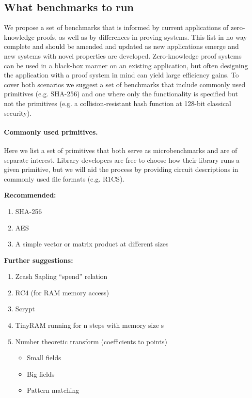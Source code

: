 \subsection{What benchmarks to run}
We propose a set of benchmarks that is informed by current applications of zero-knowledge proofs, as well as by differences in proving systems. This list in no way complete and should be amended and updated as new applications emerge and new systems with novel properties are developed. Zero-knowledge proof systems can be used in a black-box manner on an existing application, but often designing the application with a proof system in mind can yield large efficiency gains. To cover both scenarios we suggest a set of benchmarks that include commonly used primitives (e.g. SHA-256) and one where only the functionality is specified but not the primitives (e.g. a collision-resistant hash function at 128-bit classical security). 


\paragraph{Commonly used primitives.}

Here we list a set of primitives that both serve as microbenchmarks and are of separate interest. Library developers are free to choose how their library runs a given primitive, but we will aid the process by providing circuit descriptions in commonly used file formats (e.g. R1CS). 


\textbf{Recommended:}
\begin{enumerate}
    \item SHA-256
    \item AES
    \item A simple vector or matrix product at different sizes
\end{enumerate}

\textbf{Further suggestions:}
\begin{enumerate}[label={- }]
    \item Zcash Sapling “spend” relation
    \item RC4 (for RAM memory access)
    \item Scrypt
    \item TinyRAM running for n steps with memory size s 
    \item Number theoretic transform (coefficients to points)
		\begin{itemize}[label={- }]
        \item Small fields 
        \item Big fields
        \item Pattern matching
		\end{itemize}
\end{enumerate}


